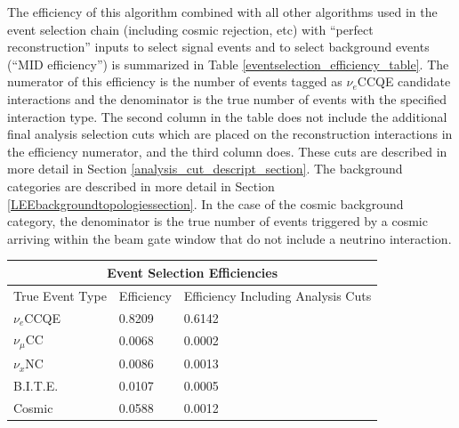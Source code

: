 The efficiency of this algorithm combined with all other algorithms used in the event selection chain (including cosmic rejection, etc) with ``perfect reconstruction'' inputs to select signal events and to select background events (``MID efficiency'') is summarized in Table \ref{eventselection_efficiency_table}. The numerator of this efficiency is the number of events tagged as $\nu_e$CCQE candidate interactions and the denominator is the true number of events with the specified interaction type. The second column in the table does not include the additional final analysis selection cuts which are placed on the reconstruction interactions in the efficiency numerator, and the third column does. These cuts are described in more detail in Section \ref{analysis_cut_descript_section}. The background categories are described in more detail in Section \ref{LEEbackgroundtopologiessection}. In the case of the cosmic background category, the denominator is the true number of events triggered by a cosmic arriving within the beam gate window that do not include a neutrino interaction.


\begin{center}
\begin{tabular}{ |p{4cm}|p{3cm}|p{6cm}|  }
 \hline
 \multicolumn{3}{|c|}{Event Selection Efficiencies} \\
 \hline
 True Event Type & Efficiency & Efficiency Including Analysis Cuts \\
 \hline \hline
 $\nu_e$CCQE & 0.8209 & 0.6142\\\hline
 
 $\nu_\mu$CC & 0.0068 & 0.0002\\\hline

 $\nu_x$NC & 0.0086 & 0.0013\\\hline

 B.I.T.E. & 0.0107 & 0.0005 \\\hline

 Cosmic & 0.0588 & 0.0012\\\hline

 \hline
\end{tabular}\label{eventselection_efficiency_table}
\end{center}






























